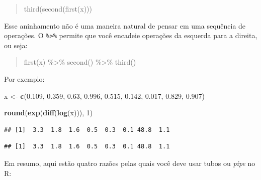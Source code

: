 \documentclass[a4paper]{book}
\newenvironment{Shaded}{\begin{snugshade}}{\end{snugshade}}
\newcommand{\CommentTok}[1]{\textcolor[rgb]{0.56,0.35,0.01}{\textit{#1}}}
\newcommand{\DecValTok}[1]{\textcolor[rgb]{0.00,0.00,0.81}{#1}}
\newcommand{\FloatTok}[1]{\textcolor[rgb]{0.00,0.00,0.81}{#1}}
\newcommand{\KeywordTok}[1]{\textcolor[rgb]{0.13,0.29,0.53}{\textbf{#1}}}
\newcommand{\NormalTok}[1]{#1}
\newcommand{\OperatorTok}[1]{\textcolor[rgb]{0.81,0.36,0.00}{\textbf{#1}}}
\newcommand{\StringTok}[1]{\textcolor[rgb]{0.31,0.60,0.02}{#1}}
\begin{document}
\begin{quote}
third(second(first(x)))
\end{quote}

Esse aninhamento não é uma maneira natural de pensar em uma sequência de operações. O \texttt{\%\textgreater{}\%} permite que você encadeie operações da esquerda para a direita, ou seja:

\begin{quote}
first(x) \%\textgreater\% second() \%\textgreater\% third()
\end{quote}

Por exemplo:

\begin{Shaded}
\begin{Highlighting}[]
\NormalTok{x <-}\StringTok{ }\KeywordTok{c}\NormalTok{(}\FloatTok{0.109}\NormalTok{, }\FloatTok{0.359}\NormalTok{, }\FloatTok{0.63}\NormalTok{, }\FloatTok{0.996}\NormalTok{, }\FloatTok{0.515}\NormalTok{, }\FloatTok{0.142}\NormalTok{, }\FloatTok{0.017}\NormalTok{, }\FloatTok{0.829}\NormalTok{, }\FloatTok{0.907}\NormalTok{)}

\KeywordTok{round}\NormalTok{(}\KeywordTok{exp}\NormalTok{(}\KeywordTok{diff}\NormalTok{(}\KeywordTok{log}\NormalTok{(x))), }\DecValTok{1}\NormalTok{)}
\end{Highlighting}
\end{Shaded}

\begin{verbatim}
## [1]  3.3  1.8  1.6  0.5  0.3  0.1 48.8  1.1
\end{verbatim}

\begin{Shaded}
\end{Shaded}

\begin{verbatim}
## [1]  3.3  1.8  1.6  0.5  0.3  0.1 48.8  1.1
\end{verbatim}

Em resumo, aqui estão quatro razões pelas quais você deve usar tubos ou \emph{pipe} no R:
\end{document}
